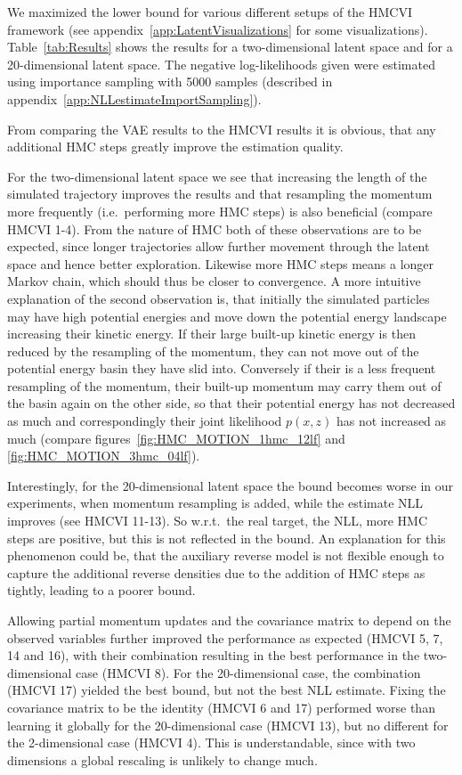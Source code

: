 We maximized the lower bound for various different setups of the HMCVI framework (see appendix~\ref{app:LatentVisualizations} for some visualizations). Table~\ref{tab:Results} shows the results for a two-dimensional latent space and for a 20-dimensional latent space. The negative log-likelihoods given were estimated using importance sampling with 5000 samples (described in appendix~\ref{app:NLLestimateImportSampling}).

From comparing the VAE results to the HMCVI results it is obvious, that any additional HMC steps greatly improve the estimation quality. 

For the two-dimensional latent space we see that increasing the length of the simulated trajectory improves the results and that resampling the momentum more frequently (i.e.\ performing more HMC steps) is also beneficial (compare HMCVI 1-4). From the nature of HMC both of these observations are to be expected, since longer trajectories allow further movement through the latent space and hence better exploration. Likewise more HMC steps means a longer Markov chain, which should thus be closer to convergence. A more intuitive explanation of the second observation is, that initially the simulated particles may have high potential energies and move down the potential energy landscape increasing their kinetic energy. If their large built-up kinetic energy is then reduced by the resampling of the momentum, they can not move out of the potential energy basin they have slid into. Conversely if their is a less frequent resampling of the momentum, their built-up momentum may carry them out of the basin again on the other side, so that their potential energy has not decreased as much and correspondingly their joint likelihood $p(x, z)$ has not increased as much (compare figures~\ref{fig:HMC_MOTION_1hmc_12lf} and \ref{fig:HMC_MOTION_3hmc_04lf}).

Interestingly, for the 20-dimensional latent space the bound becomes worse in our experiments, when momentum resampling is added, while the estimate NLL improves (see HMCVI 11-13). So w.r.t.\ the real target, the NLL, more HMC steps are positive, but this is not reflected in the bound. An explanation for this phenomenon could be, that the auxiliary reverse model is not flexible enough to capture the additional reverse densities due to the addition of HMC steps as tightly, leading to a poorer bound.

Allowing partial momentum updates and the covariance matrix to depend on the observed variables further improved the performance as expected (HMCVI 5, 7, 14 and 16), with their combination resulting in the best performance in the two-dimensional case (HMCVI 8). For the 20-dimensional case, the combination (HMCVI 17) yielded the best bound, but not the best NLL estimate. Fixing the covariance matrix to be the identity (HMCVI 6 and 17) performed worse than learning it globally for the 20-dimensional case (HMCVI 13), but no different for the 2-dimensional case (HMCVI 4). This is understandable, since with two dimensions a global rescaling is unlikely to change much.

